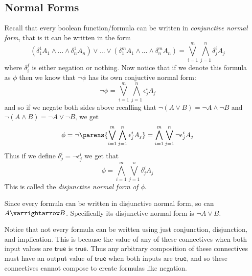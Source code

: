 \documentclass[10pt]{article}
\let\to=\varrightarrow
\def\true{\mathsf{true}}
\begin{document}


\bigskip

\subsection{Normal Forms}

Recall that every boolean function/formula can be written in \textit{conjunctive normal form}, that is it can be written in the form
\[ (\delta_1^1A_1\land\dots\land\delta_n^1A_n)\lor\dots\lor(\delta_1^mA_1\land\dots\land\delta_n^mA_n) = \bigvee_{i=1}^m\bigwedge_{j=1}^n\delta_j^iA_j \]
where $\delta_i^j$ is either negation or nothing.
Now notice that if we denote this formula as $\phi$ then we know that $\neg\phi$ has its own conjuctive normal form:
\[ \neg\phi = \bigvee_{i=1}^m\bigwedge_{j=1}^n\epsilon_j^iA_j \]
and so if we negate both sides above recalling that $\neg(A\lor B)=\neg A\land\neg B$ and $\neg(A\land B)=\neg A\lor\neg B$, we get
\[ \phi = \neg\parens{\bigvee_{i=1}^m\bigwedge_{j=1}^n\epsilon_j^iA_j} = \bigwedge_{i=1}^m\bigvee_{j=1}^n\neg\epsilon_j^iA_j \]
Thus if we define $\delta_j^i=\neg\epsilon_j^i$ we get that
\[ \phi = \bigwedge_{i=1}^m\bigvee_{j=1}^n\delta_j^iA_j \]
This is called the \textit{disjunctive normal form of $\phi$}.

Since every formula can be written in disjunctive normal form, so can $A\to B$.
Specifically its disjunctive normal form is $\neg A\lor B$.

Notice that not every formula can be written using just conjunction, disjunction, and implication.
This is because the value of any of these connectives when both input values are $\true$ is $\true$.
Thus any arbitrary composition of these connectives must have an output value of $\true$ when both inputs are $\true$, and so these connectives cannot compose to create formulas like negation.
\end{document}
